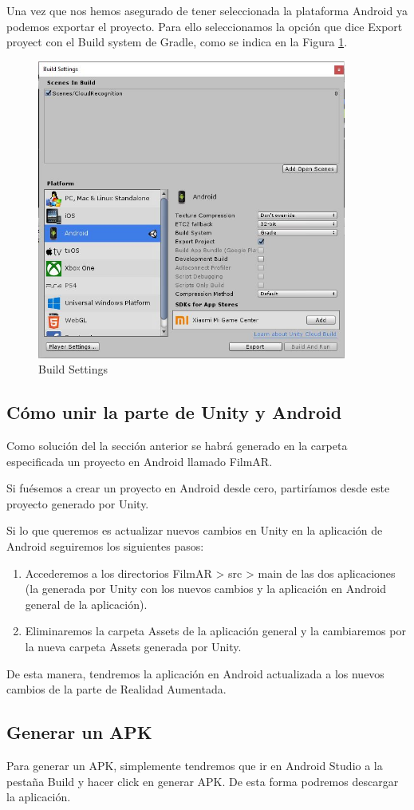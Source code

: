 \begin{enumerate}
    Una vez que nos hemos asegurado de tener seleccionada la plataforma Android ya podemos exportar el proyecto. Para ello seleccionamos la opción 
    que dice Export proyect con el Build system de Gradle, como se indica en la Figura \ref{fig:BuildSettings}.
    \begin{figure}[H]
        \centering
        \includegraphics[width=4in]{figures/Appendix-A/CapturaBuildSettings.JPG}
        \caption{Build Settings}
        \label{fig:BuildSettings}
    \end{figure}
\end{enumerate}
\subsection{Cómo unir la parte de Unity y Android}
Como solución del la sección anterior se habrá generado en la carpeta especificada un proyecto en Android llamado FilmAR.

Si fuésemos a crear un proyecto en Android desde cero, partiríamos desde este proyecto generado por Unity. 

Si lo que queremos es actualizar nuevos cambios en Unity en la aplicación de Android seguiremos los siguientes pasos:
\begin{enumerate}
    \item Accederemos a los directorios FilmAR > src > main de las dos aplicaciones (la generada por Unity con los nuevos cambios 
    y la aplicación en Android general de la aplicación).
    \item Eliminaremos la carpeta Assets de la aplicación general y la cambiaremos por la nueva carpeta Assets generada por Unity.
\end{enumerate}
De esta manera, tendremos la aplicación en Android actualizada a los nuevos cambios de la parte de Realidad Aumentada.
\subsection{Generar un APK}
Para generar un APK, simplemente tendremos que ir en Android Studio a la pestaña Build y hacer click en generar APK. De esta forma podremos 
descargar la aplicación.